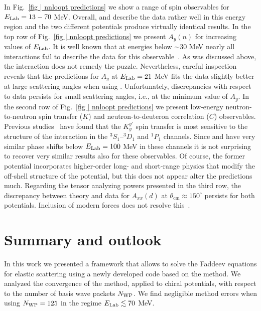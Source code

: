 \documentclass[aps,prc,showpacs,twocolumn,floatfix,nobibnotes,nofootinbib,amsmath,amssymb,longbibliography]{revtex4-2}
\begin{document}
In Fig.~\ref{fig | nnloopt predictions} we show a range of spin
observables for $E_\text{Lab}=13-70$ MeV. Overall, \NNLOopt{} and \INNNLO{}
describe the data rather well in this energy region and the two
different potentials produce virtually identical results. In the top
row of Fig.~\ref{fig | nnloopt predictions} we present $A_y(n)$ for
increasing values of $E_\text{Lab}$. It is well known that at energies below
$\sim 30$ MeV nearly all \NN{} interactions fail to describe the data
for this observable~\cite{Weisel:2015min}. As was discussed above, the
\NNLOopt{} interaction does not remedy the puzzle. Nevertheless,
careful inspection reveals that the predictions for $A_y$ at
$E_\text{Lab}=21$ MeV fits the data slightly better at large scattering
angles when using \NNLOopt{}. Unfortunately, discrepancies with
respect to data persists for small scattering angles, i.e., at the
minimum value of $A_y$. In the second row of Fig.~\ref{fig | nnloopt
  predictions} we present low-energy neutron-to-neutron spin transfer
($K$) and neutron-to-deuteron correlation ($C$) observables. Previous
studies~\cite{Clajus:1990rzf} have found that the $K_y^{y'}$ spin
transfer is most sensitive to the structure of the \NN{} interaction
in the $^3S_1$--$^3D_1$ and $^1P_1$ channels. Since \INNNLO{} and
\NNLOopt{} have very similar \NN{} phase shifts below $E_\text{Lab}=100$ MeV
in these channels it is not surprising to recover very similar results
also for these observables. Of course, the former potential
incorporates higher-order long- and short-range physics that modify
the off-shell structure of the potential, but this does not appear
alter the predictions much. Regarding the tensor analyzing powers
presented in the third row, the discrepancy between theory and data
for $A_{xx}(d)$ at $\theta_\text{cm} \approx 150 ^{\circ}$ persists
for both potentials. Inclusion of modern \NNN{} forces does not
resolve this~\cite{Epelbaum:2019zqc}.

\section{Summary and outlook}
\label{sec | summary and outlook}
In this work we presented a framework that allows to solve the Faddeev
equations for elastic \Nd{} scattering using a newly developed code
based on the \wpcd{} method. We analyzed the convergence of the
\wpcd{} method, applied to chiral potentials, with respect to the
number of basis wave packets $N_{\text{WP}}$. We find negligible method errors
when using $N_{\text{WP}}=125$ in the regime $E_\text{Lab} \lesssim 70$ MeV.
\end{document}
